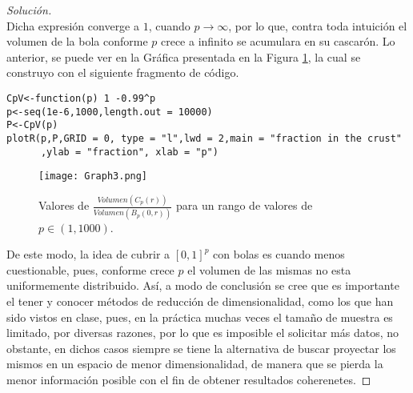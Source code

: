 \documentclass[10.5pt,notitlepage]{article}
\newenvironment{solucion}
  {\begin{proof}[Solución]}
  {\end{proof}}
\theoremstyle{plain}
\begin{document}
\begin{solucion}
\begin{equation*}
\end{equation*}
Dicha expresión converge a \(1\), cuando \(p \to \infty\), por lo que, contra toda intuición el volumen de la bola conforme \(p\) crece a infinito se acumulara en su cascarón. Lo anterior, se puede ver en la Gráfica presentada en la Figura \ref{fig:7}, la cual se construyo con el siguiente fragmento de código.
\begin{verbatim}
CpV<-function(p) 1 -0.99^p
p<-seq(1e-6,1000,length.out = 10000)
P<-CpV(p)
plotR(p,P,GRID = 0, type = "l",lwd = 2,main = "fraction in the crust"
      ,ylab = "fraction", xlab = "p")
\end{verbatim}
 \begin{figure}[htb]
    \centering
    \texttt{[image: Graph3.png]}
    \caption{Valores de \(\frac{Volumen(C_{p}(r))}{Volumen(B_{p}(0,r))}\) para un rango de valores de \(p \in(1,1000)\).}
    \label{fig:7}
\end{figure}
De este modo, la idea de cubrir a \([0,1]^p\) con bolas es cuando menos cuestionable, pues, conforme crece \(p\) el volumen de las mismas no esta uniformemente distribuido. Así, a modo de conclusión se cree que es importante el tener y conocer métodos de reducción de dimensionalidad, como los que han sido vistos en clase, pues, en la práctica muchas veces el tamaño de muestra es limitado, por diversas razones, por lo que es imposible el solicitar más datos, no obstante, en dichos casos siempre se tiene la alternativa de buscar proyectar los mismos en un espacio de menor dimensionalidad, de manera que se pierda la menor información posible con el fin de obtener resultados coherenetes.
\end{solucion}
\end{document}
